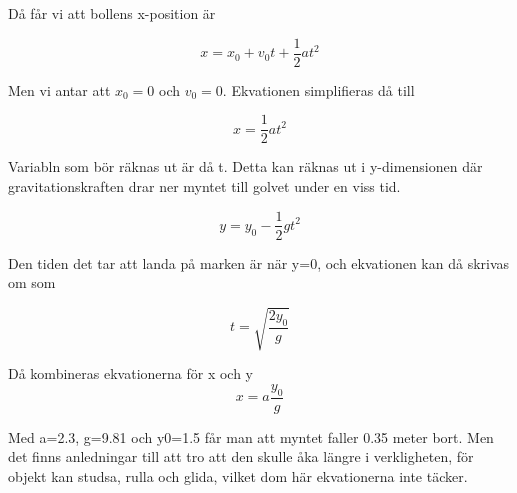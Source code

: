\documentclass[a4paper,12pt]{article}
\begin{document}
\begin{enumerate}
          Då får vi att bollens x-position är

          $$x=x_0+v_0t+\frac{1}{2}at^2$$

          Men vi antar att $x_0=0$ och $v_0=0$.
          Ekvationen simplifieras då till

          $$x=\frac{1}{2}at^2$$

          Variabln som bör räknas ut är då t. Detta
          kan räknas ut i y-dimensionen där gravitationskraften
          drar ner myntet till golvet under en viss tid.

          $$y=y_0-\frac{1}{2}gt^2$$

          Den tiden det tar att landa på marken är när y=0,
          och ekvationen kan då skrivas om som

          $$t=\sqrt{\frac{2y_0}{g}}$$

          Då kombineras ekvationerna för x och y
          $$x=a\frac{y_0}{g}$$

          Med a=2.3, g=9.81 och y0=1.5 får man att
          myntet faller 0.35 meter bort. Men det finns anledningar
          till att tro att den skulle åka längre i verkligheten, för
          objekt kan studsa, rulla och glida, vilket dom här
          ekvationerna inte täcker.

\end{enumerate}
\end{document}
